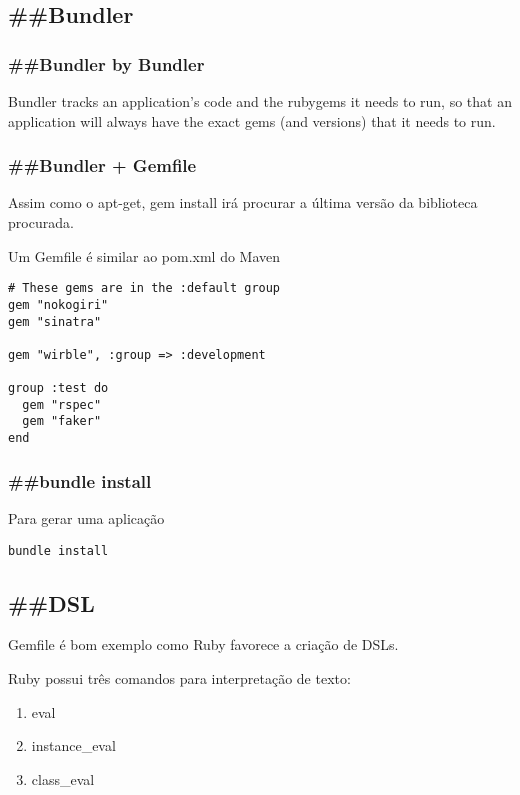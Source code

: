 \documentclass[serif,mathserif]{article}
\begin{document}
\subsection{\#\#Bundler}

\subsubsection{\#\#Bundler by Bundler}

Bundler tracks an application's code and the rubygems it needs to run, so that an application will always have the exact gems (and versions) that it needs to run.

\subsubsection{\#\#Bundler + Gemfile}

Assim como o apt-get, gem install irá procurar a última versão da biblioteca procurada.

Um Gemfile é similar ao pom.xml do Maven

\begin{lstlisting}
# These gems are in the :default group
gem "nokogiri"
gem "sinatra"

gem "wirble", :group => :development

group :test do
  gem "rspec"
  gem "faker"
end
\end{lstlisting}

\subsubsection {\#\#bundle install}

Para gerar uma aplicação
\begin{verbatim}
bundle install
\end{verbatim}

\subsection {\#\#DSL}
Gemfile é bom exemplo como Ruby favorece a criação de DSLs.

Ruby possui três comandos para interpretação de texto:
\begin{enumerate}
  \item eval
  \item instance\_eval
  \item class\_eval
\end{enumerate}
\end{document}
